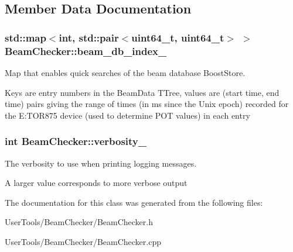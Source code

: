 \subsection{Member Data Documentation}
\hypertarget{classBeamChecker_aab9b16fbdd8cdea6aa1a77fc2f0ea842}{
\subsubsection[{beam\-\_\-db\-\_\-index\-\_\-}]{\setlength{\rightskip}{0pt plus 5cm}std\-::map$<$int, std\-::pair$<$uint64\-\_\-t, uint64\-\_\-t$>$ $>$ Beam\-Checker\-::beam\-\_\-db\-\_\-index\-\_\-\hspace{0.3cm}{\ttfamily [protected]}}}\label{classBeamChecker_aab9b16fbdd8cdea6aa1a77fc2f0ea842}


Map that enables quick searches of the beam database Boost\-Store. 

Keys are entry numbers in the Beam\-Data T\-Tree, values are (start time, end time) pairs giving the range of times (in ms since the Unix epoch) recorded for the E\-:T\-O\-R875 device (used to determine P\-O\-T values) in each entry \hypertarget{classBeamChecker_aceafb01556c2541a737d4feaab2f757e}{
\subsubsection[{verbosity\-\_\-}]{\setlength{\rightskip}{0pt plus 5cm}int Beam\-Checker\-::verbosity\-\_\-\hspace{0.3cm}{\ttfamily [protected]}}}\label{classBeamChecker_aceafb01556c2541a737d4feaab2f757e}


The verbosity to use when printing logging messages. 

A larger value corresponds to more verbose output 

The documentation for this class was generated from the following files\-:\begin{DoxyCompactItemize}
\item 
User\-Tools/\-Beam\-Checker/Beam\-Checker.\-h\item 
User\-Tools/\-Beam\-Checker/Beam\-Checker.\-cpp\end{DoxyCompactItemize}
